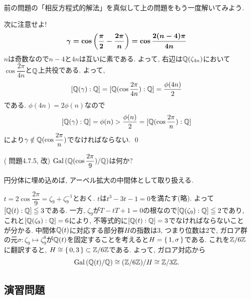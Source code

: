 \begin{prac}前の問題の「相反方程式的解法」を真似して上の問題をもう一度解いてみよう.
\end{prac}

\begin{egans}次に注意せよ!
\[{\mbox{\boldmath $\gamma = \cos{\left( \dfrac{\pi}{2} - \dfrac{2\pi}{n} \right)} = \cos{\dfrac{2(n-4)\pi}{4n}}$}}\]
$n$は奇数なので$n-4$と$4n$は互いに素である. よって, 右辺は$\mathbb{Q}(\zeta_{4n})$において$\cos{\dfrac{2\pi}{4n}}$と$\mathbb{Q}$上共役である. よって,
\[ [\mathbb{Q}(\gamma):\mathbb{Q}] = [\mathbb{Q}(\cos{\dfrac{2\pi}{4n}}):\mathbb{Q}] = \dfrac{\phi(4n)}{2}  \]
である. $\phi(4n) = 2\phi(n)$なので
\[[\mathbb{Q}(\gamma):\mathbb{Q}] = \phi(n) > \dfrac{\phi(n)}{2} = [\mathbb{Q}(\cos{\dfrac{2\pi}{n}}): \mathbb{Q}] \]
により$\gamma \notin \mathbb{Q}(\cos{\dfrac{2\pi}{n}})$でなければならない. \qed
\end{egans}

\begin{egprob} (\cite{aoyukie} 問題4.7.5, 改) \label{egprob:gal=z/3z_example}
$\operatorname{Gal}{(\mathbb{Q}(\cos{\dfrac{2\pi}{9}})/\mathbb{Q})}$は何か?
\end{egprob}
\begin{point}
円分体に埋め込めば, アーベル拡大の中間体として取り扱える.
\end{point}
\begin{egans}
$t=2\cos{\dfrac{2\pi}{9}} = \zeta_9 + \zeta_9^{-1}$とおく. $t$は$t^3 - 3t - 1= 0$を満たす(略). よって$[\mathbb{Q}(t):\mathbb{Q}]\leqq 3$である. 一方, $\zeta_9$が$T - tT + 1 = 0$の根なので$[\mathbb{Q}(\zeta_9):\mathbb{Q}]\leqq 2$であり, これと$[\mathbb{Q}(\zeta_9): \mathbb{Q}] = 6$により, 不等式的に$[\mathbb{Q}(t):\mathbb{Q}] = 3$でなければならないことが分かる. 中間体$\mathbb{Q}(t)$に対応する部分群$H$の指数は3, つまり位数は2で, ガロア群の元$\sigma: \zeta_9\mapsto \zeta_9^{8}$が$\mathbb{Q}(t)$を固定することを考えると$H = \set{1,\sigma}$である. これを$\mathbb{Z}/6\mathbb{Z}$に翻訳すると, $H\cong \set{0,3}\subset \mathbb{Z}/6\mathbb{Z}$である. よって, ガロア対応から
\[\operatorname{Gal}{(\mathbb{Q}(t)/\mathbb{Q})} \cong (\mathbb{Z}/6\mathbb{Z}) / H \cong \mathbb{Z}/3\mathbb{Z}.\]

\end{egans}


\subsection{演習問題}



